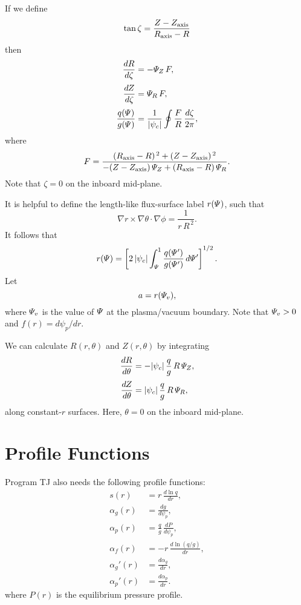 \documentclass[notitlepage,12pt]{article}
\begin{document}
If we define
\begin{equation}
\tan\zeta = \frac{Z-Z_{\rm axis}}{R_{\rm axis}-R}
\end{equation}
then
\begin{align}
\frac{dR}{d\zeta} &= -{\mit\Psi}_Z\,F,\\[0.5ex]
\frac{dZ}{d\zeta} &= {\mit\Psi}_R\,F,\\[0.5ex]
\frac{q({\mit\Psi})}{g({\mit\Psi})} &= \frac{1}{|\psi_c|}\oint \frac{F}{R}\,\frac{d\zeta}{2\pi},
\end{align}
where
\begin{equation}
F = \frac{(R_{\rm axis}-R)^{\,2} + (Z-Z_{\rm axis})^{\,2}}{-(Z-Z_{\rm axis})\,{\mit\Psi}_Z + (R_{\rm axis}-R)\,{\mit\Psi}_R}.
\end{equation}
Note that $\zeta=0$ on the inboard mid-plane.

It is helpful to define the length-like flux-surface label $r({\mit\Psi})$, such that 
\begin{equation}
\nabla r\times \nabla\theta\cdot\nabla \phi = \frac{1}{r\,R^{\,2}}.
\end{equation}
It follows that
\begin{equation}
r({\mit\Psi}) = \left[2\,|\psi_c|\int_{{\mit\Psi}}^1\frac{q({\mit\Psi}')}
{g({\mit\Psi}')}\,d{\mit\Psi}'\right]^{1/2}.
\end{equation}
Let
\begin{equation}
a = r ({\mit\Psi}_v),
\end{equation}
where ${\mit\Psi}_v$ is the value of ${\mit\Psi}$ at the plasma/vacuum boundary. 
Note that ${\mit\Psi}_v>0$ and $f(r)=d\psi_p/dr$. 

We can calculate $R(r,\theta)$ and $Z(r,\theta)$ by integrating 
\begin{align}
\frac{dR}{d\theta}&=-|\psi_c|\,\frac{q}{g}\,R\,{\mit\Psi}_Z,\\[0.5ex]
\frac{dZ}{d\theta} &= |\psi_c|\,\frac{q}{g}\,R\,{\mit\Psi}_R,
\end{align}
along constant-$r$ surfaces. Here, $\theta=0$ on the inboard mid-plane. 

\section{Profile Functions}
Program TJ also needs the following profile functions:
\begin{align}
s(r) &= r\,\frac{d\ln q}{dr},\\[0.5ex]
\alpha_g(r)&=\frac{dg}{d\psi_p},\\[0.5ex]
\alpha_p(r) &=\frac{q}{g}\,\frac{dP}{d\psi_p},\\[0.5ex]
\alpha_f(r) &= -r\,\frac{d\ln(q/g)}{dr},\\[0.5ex]
\alpha_g'(r) &= \frac{d\alpha_g}{dr},\\[0.5ex]
\alpha_p'(r) &= \frac{d\alpha_p}{dr}.
\end{align}
where $P(r)$ is the equilibrium pressure profile. 
\end{document}
